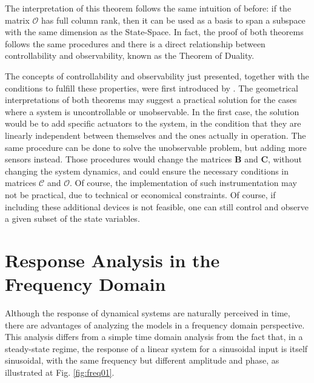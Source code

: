 \documentclass[a4paper,11pt]{book}
\numberwithin{figure}{chapter}
\numberwithin{equation}{chapter}
\numberwithin{table}{chapter}
\theoremstyle{definition}
\begin{document}
The interpretation of this theorem follows the same intuition of before: if the matrix $\bm{\mathcal{O}}$ has full column rank, then it can be used as a basis to span a subspace with the same dimension as the State-Space. In fact, the proof of both theorems follows the same procedures and there is a direct relationship between controllability and observability, known as the Theorem of Duality.

The concepts of controllability and observability just presented, together with the conditions to fulfill these properties, were first introduced by \cite{Kalman:1960}. The geometrical interpretations of both theorems may suggest a practical solution for the cases where a system is uncontrollable or unobservable. In the first case, the solution would be to add specific actuators to the system, in the condition that they are linearly independent between themselves and the ones actually in operation. The same procedure can be done to solve the unobservable problem, but adding more sensors instead. Those procedures would change the matrices $\bm{B}$ and $\bm{C}$, without changing the system dynamics, and could ensure the necessary conditions in matrices $\bm{\mathcal{C}}$ and $\bm{\mathcal{O}}$. Of course, the implementation of such instrumentation may not be practical, due to technical or economical constraints. Of course, if including these additional devices is not feasible, one can still control and observe a given subset of the state variables.

\section{Response Analysis in the Frequency Domain}

Although the response of dynamical systems are naturally perceived in time, there are advantages of analyzing the models in a frequency domain perspective. This analysis differs from a simple time domain analysis from the fact that, in a steady-state regime, the response of a linear system for a sinusoidal input is itself sinusoidal, with the same frequency but different amplitude and phase, as illustrated at Fig. \ref{fig:freq01}.
\end{document}

